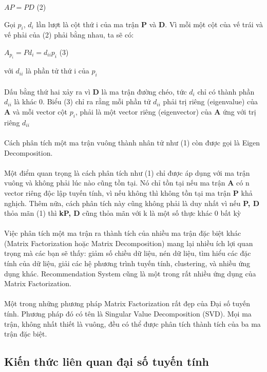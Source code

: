 \begin{center}
	$AP=PD$ (2)
\end{center}
Gọi $p_i$, $d_i$ lần lượt là cột thứ i của ma trận $\textbf{P}$ và \textbf{D}. Vì mỗi một cột của vế trái và vế phải của (2) phải bằng nhau, ta sẽ có:\\
\begin{center}
	$A_{p_i}=Pd_i=d_{ii}p_i$ (3)
\end{center}
với $d_{ii}$ là phần tử thứ i của $p_i$\\
\\ 
Dấu bằng thứ hai xảy ra vì \textbf{D} là ma trận đường chéo, tức $d_i$ chỉ có thành phần $d_{ii}$ là khác 0. Biểu (3) chỉ ra rằng mỗi phần tử $d_{ii}$ phải trị riêng (eigenvalue) của \textbf{A} và mỗi vector cột $p_i$, phải là một vector riêng (eigenvector) của \textbf{A} ứng với trị riêng $d_{ii}$\\
\\
Cách phân tích một ma trận vuông thành nhân tử như (1) còn được gọi là Eigen Decomposition. \\
\\
Một điểm quan trọng là cách phân tích như (1) chỉ được áp dụng với ma trận vuông và không phải lúc nào cũng tồn tại. Nó chỉ tồn tại nếu ma trận \textbf{A} có n vector riêng độc lập tuyến tính, vì nếu không thì không tồn tại ma trận \textbf{P} khả nghịch. Thêm nữa, cách phân tích này cũng không phải là duy nhất vì nếu \textbf{P, D} thỏa mãn (1) thì \textbf{kP, D} cũng thỏa mãn với k là một số thực khác 0 bất kỳ\\
\\
Việc phân tích một ma trận ra thành tích của nhiều ma trận đặc biệt khác (Matrix Factorization hoặc Matrix Decomposition) mang lại nhiều ích lợi quan trọng mà các bạn sẽ thấy: giảm số chiều dữ liệu, nén dữ liệu, tìm hiểu các đặc tính của dữ liệu, giải các hệ phương trình tuyến tính, clustering, và nhiều ứng dụng khác. Recommendation System cũng là một trong rất nhiều ứng dụng của Matrix Factorization.\\
\\
Một trong những phương pháp Matrix Factorization rất đẹp của Đại số tuyến tính. Phương pháp đó có tên là Singular Value Decomposition (SVD). Mọi ma trận, không nhất thiết là vuông, đều có thể được phân tích thành tích của ba ma trận đặc biệt.
\newpage 
\subsection{Kiến thức liên quan đại số tuyến tính} 
